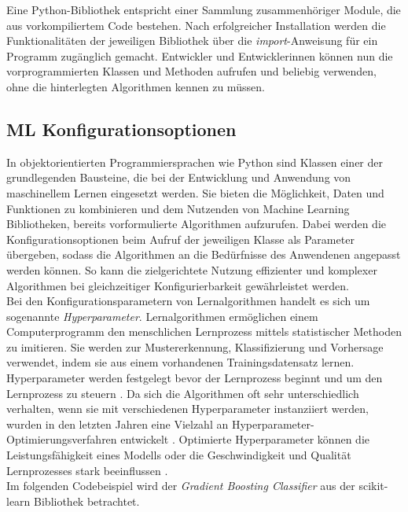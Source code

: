 \documentclass[german,bachelor]{swsLeipzig}
\begin{document}
Eine Python-Bibliothek entspricht einer Sammlung zusammenhöriger Module, die aus vorkompiliertem Code bestehen.
Nach erfolgreicher Installation werden die Funktionalitäten der jeweiligen Bibliothek über die \textit{import}-Anweisung für ein Programm zugänglich
gemacht.
Entwickler und Entwicklerinnen können nun die vorprogrammierten Klassen und Methoden aufrufen und beliebig verwenden,
ohne die hinterlegten Algorithmen kennen zu müssen.

\subsection{ML Konfigurationsoptionen} \label{ML Konfigurationsoptionen}
In objektorientierten Programmiersprachen wie Python sind Klassen einer der grundlegenden Bausteine, die bei der Entwicklung und Anwendung
von maschinellem Lernen eingesetzt werden.
Sie bieten die Möglichkeit, Daten und Funktionen zu kombinieren und dem Nutzenden von Machine Learning Bibliotheken,
bereits vorformulierte Algorithmen aufzurufen.
Dabei werden die Konfigurationsoptionen beim Aufruf der jeweiligen Klasse als Parameter übergeben, sodass die Algorithmen
an die Bedürfnisse des Anwendenen angepasst werden können.
So kann die zielgerichtete Nutzung effizienter und komplexer Algorithmen bei gleichzeitiger Konfigurierbarkeit gewährleistet werden. \\

Bei den Konfigurationsparametern von Lernalgorithmen handelt es sich um sogenannte \textit{Hyperparameter}.
Lernalgorithmen ermöglichen einem Computerprogramm den menschlichen Lernprozess mittels statistischer Methoden zu imitieren.
Sie werden zur Mustererkennung, Klassifizierung und Vorhersage verwendet, indem sie aus einem vorhandenen Trainingsdatensatz
lernen.
Hyperparameter werden festgelegt bevor der Lernprozess beginnt und um den Lernprozess zu steuern \cite[]{hype}.
Da sich die Algorithmen oft sehr unterschiedlich verhalten, wenn sie mit verschiedenen Hyperparameter instanziiert werden,
wurden in den letzten Jahren eine Vielzahl an Hyperparameter-Optimierungsverfahren entwickelt \cite[]{pmlr-v32-hutter14}.
Optimierte Hyperparameter können die Leistungsfähigkeit eines Modells oder die Geschwindigkeit und Qualität Lernprozesses stark beeinflussen \cite[]{hype}.\\

Im folgenden Codebeispiel wird der \textit{Gradient Boosting Classifier} aus der scikit-learn Bibliothek betrachtet.\\
\end{document}
